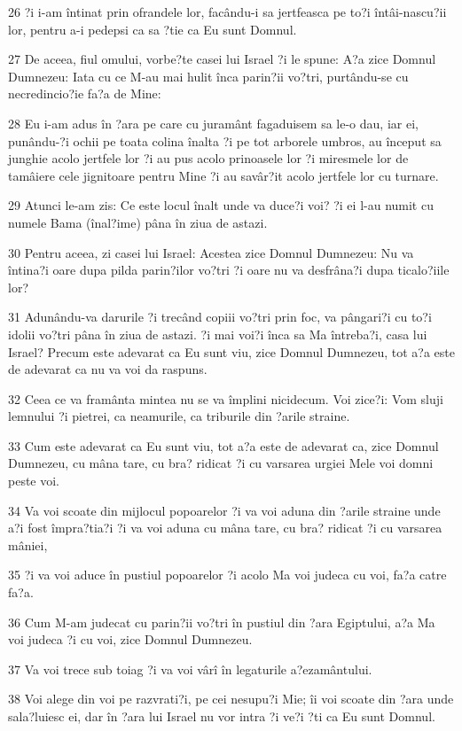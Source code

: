 \par 26 ?i i-am întinat prin ofrandele lor, facându-i sa jertfeasca pe to?i întâi-nascu?ii lor, pentru a-i pedepsi ca sa ?tie ca Eu sunt Domnul.
\par 27 De aceea, fiul omului, vorbe?te casei lui Israel ?i le spune: A?a zice Domnul Dumnezeu: Iata cu ce M-au mai hulit înca parin?ii vo?tri, purtându-se cu necredincio?ie fa?a de Mine:
\par 28 Eu i-am adus în ?ara pe care cu juramânt fagaduisem sa le-o dau, iar ei, punându-?i ochii pe toata colina înalta ?i pe tot arborele umbros, au început sa junghie acolo jertfele lor ?i au pus acolo prinoasele lor ?i miresmele lor de tamâiere cele jignitoare pentru Mine ?i au savâr?it acolo jertfele lor cu turnare.
\par 29 Atunci le-am zis: Ce este locul înalt unde va duce?i voi? ?i ei l-au numit cu numele Bama (înal?ime) pâna în ziua de astazi.
\par 30 Pentru aceea, zi casei lui Israel: Acestea zice Domnul Dumnezeu: Nu va întina?i oare dupa pilda parin?ilor vo?tri ?i oare nu va desfrâna?i dupa ticalo?iile lor?
\par 31 Adunându-va darurile ?i trecând copiii vo?tri prin foc, va pângari?i cu to?i idolii vo?tri pâna în ziua de astazi. ?i mai voi?i înca sa Ma întreba?i, casa lui Israel? Precum este adevarat ca Eu sunt viu, zice Domnul Dumnezeu, tot a?a este de adevarat ca nu va voi da raspuns.
\par 32 Ceea ce va framânta mintea nu se va împlini nicidecum. Voi zice?i: Vom sluji lemnului ?i pietrei, ca neamurile, ca triburile din ?arile straine.
\par 33 Cum este adevarat ca Eu sunt viu, tot a?a este de adevarat ca, zice Domnul Dumnezeu, cu mâna tare, cu bra? ridicat ?i cu varsarea urgiei Mele voi domni peste voi.
\par 34 Va voi scoate din mijlocul popoarelor ?i va voi aduna din ?arile straine unde a?i fost împra?tia?i ?i va voi aduna cu mâna tare, cu bra? ridicat ?i cu varsarea mâniei,
\par 35 ?i va voi aduce în pustiul popoarelor ?i acolo Ma voi judeca cu voi, fa?a catre fa?a.
\par 36 Cum M-am judecat cu parin?ii vo?tri în pustiul din ?ara Egiptului, a?a Ma voi judeca ?i cu voi, zice Domnul Dumnezeu.
\par 37 Va voi trece sub toiag ?i va voi vârî în legaturile a?ezamântului.
\par 38 Voi alege din voi pe razvrati?i, pe cei nesupu?i Mie; îi voi scoate din ?ara unde sala?luiesc ei, dar în ?ara lui Israel nu vor intra ?i ve?i ?ti ca Eu sunt Domnul.
